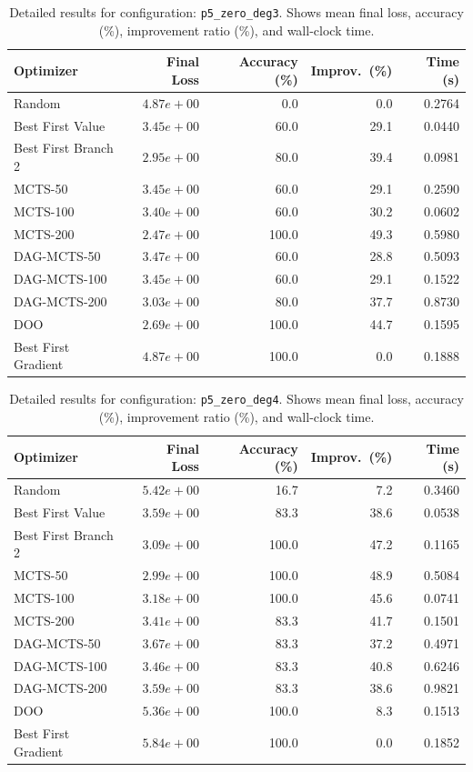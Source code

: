 \begin{table}[H]
\centering
\caption{Detailed results for configuration: \texttt{p5\_zero\_deg3}. Shows mean final loss, accuracy (\%), improvement ratio (\%), and wall-clock time.}
\label{tab:funclearn-detail-20}
\begin{tabular}{lrrrr}
\toprule
Optimizer & Final Loss & Accuracy (\%) & Improv.~(\%) & Time (s) \\
\midrule
Random & $4.87e+00$ & 0.0 & 0.0 & 0.2764 \\
\hline
Best First Value & $3.45e+00$ & 60.0 & 29.1 & 0.0440 \\
\hline
Best First Branch 2 & $2.95e+00$ & 80.0 & 39.4 & 0.0981 \\
\hline
MCTS-50 & $3.45e+00$ & 60.0 & 29.1 & 0.2590 \\
\hline
MCTS-100 & $3.40e+00$ & 60.0 & 30.2 & 0.0602 \\
\hline
MCTS-200 & \textbf{$2.47e+00$} & 100.0 & 49.3 & 0.5980 \\
\hline
DAG-MCTS-50 & $3.47e+00$ & 60.0 & 28.8 & 0.5093 \\
\hline
DAG-MCTS-100 & $3.45e+00$ & 60.0 & 29.1 & 0.1522 \\
\hline
DAG-MCTS-200 & $3.03e+00$ & 80.0 & 37.7 & 0.8730 \\
\hline
DOO & $2.69e+00$ & 100.0 & 44.7 & 0.1595 \\
\hline
Best First Gradient & $4.87e+00$ & 100.0 & 0.0 & 0.1888 \\
\bottomrule
\end{tabular}
\end{table}

\begin{table}[H]
\centering
\caption{Detailed results for configuration: \texttt{p5\_zero\_deg4}. Shows mean final loss, accuracy (\%), improvement ratio (\%), and wall-clock time.}
\label{tab:funclearn-detail-21}
\begin{tabular}{lrrrr}
\toprule
Optimizer & Final Loss & Accuracy (\%) & Improv.~(\%) & Time (s) \\
\midrule
Random & $5.42e+00$ & 16.7 & 7.2 & 0.3460 \\
\hline
Best First Value & $3.59e+00$ & 83.3 & 38.6 & 0.0538 \\
\hline
Best First Branch 2 & $3.09e+00$ & 100.0 & 47.2 & 0.1165 \\
\hline
MCTS-50 & \textbf{$2.99e+00$} & 100.0 & 48.9 & 0.5084 \\
\hline
MCTS-100 & $3.18e+00$ & 100.0 & 45.6 & 0.0741 \\
\hline
MCTS-200 & $3.41e+00$ & 83.3 & 41.7 & 0.1501 \\
\hline
DAG-MCTS-50 & $3.67e+00$ & 83.3 & 37.2 & 0.4971 \\
\hline
DAG-MCTS-100 & $3.46e+00$ & 83.3 & 40.8 & 0.6246 \\
\hline
DAG-MCTS-200 & $3.59e+00$ & 83.3 & 38.6 & 0.9821 \\
\hline
DOO & $5.36e+00$ & 100.0 & 8.3 & 0.1513 \\
\hline
Best First Gradient & $5.84e+00$ & 100.0 & 0.0 & 0.1852 \\
\bottomrule
\end{tabular}
\end{table}

